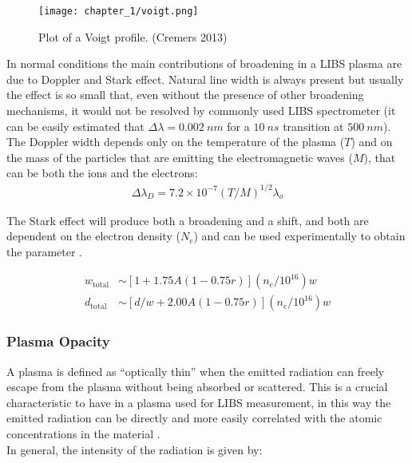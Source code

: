 \begin{figure}[H]
    \centering
    \texttt{[image: chapter\_1/voigt.png]}
    \caption{Plot of a Voigt profile. (Cremers 2013)}
    \label{fig:voigt}
\end{figure}

In normal conditions the main contributions of broadening in a LIBS plasma are due to Doppler and Stark effect. Natural line width is always present but usually the effect is so small that, even without the presence of other broadening mechanisms, it would not be resolved by commonly used LIBS spectrometer (it can be easily estimated that $\Delta\lambda = 0.002\:nm$ for a $10\:ns$ transition at $500\:nm$).
\\
The Doppler width depends only on the temperature of the plasma ($T$) and on the mass of the particles that are emitting the electromagnetic waves ($M$), that can be both the ions and the electrons:
\begin{align}
    \Delta\lambda_{D}=7.2\times{10}^{-7}\left(T/M\right)^{1/2}\lambda_{o} \label{eq:doppler_eq}
\end{align}

The Stark effect will produce both a broadening and a shift, and both are dependent on the electron density ($N_e$) and can be used experimentally to obtain the parameter \cite{griemSpectralLineBroadening2012}.

\begin{align}
    w_{\mathrm{total}}&\sim\left[1+1.75A\left(1-0.75r\right)\right]\left(n_{e}/{10}^{16}\right)w \label{eq:stark_width} \\ 
    d_{\mathrm{total}}&\sim\left[d/w+2.00A\left(1-0.75r\right)\right]\left(n_{e}/{10}^{16}\right)w \label{eq:stark_shift} 
\end{align}

\subsubsection{Plasma Opacity}
\label{subsubsec:plasma_opacity}
A plasma is defined as “optically thin” when the emitted radiation can freely escape from the plasma without being absorbed or scattered. This is a crucial characteristic to have in a plasma used for LIBS measurement, in this way the emitted radiation can be directly and more easily correlated with the atomic concentrations in the material \cite{ApparatusFundamentals2006}.
\\
In general, the intensity of the radiation is given by:

